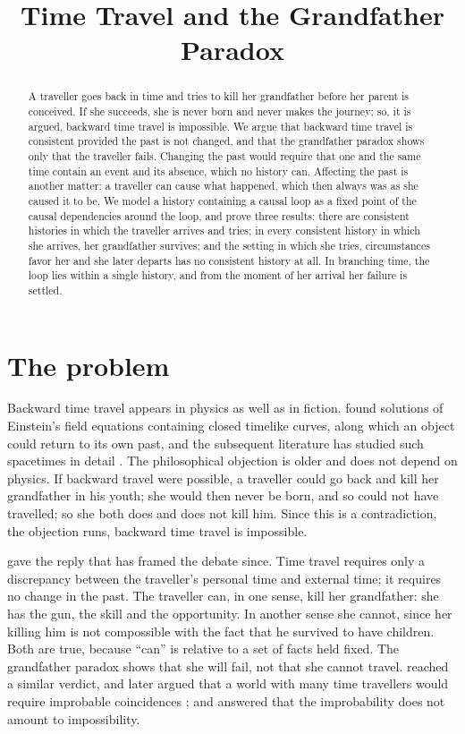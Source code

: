 \documentclass{situationist-preprint}
\title{Time Travel and the Grandfather Paradox}
\begin{document}
\maketitle

\begin{abstract}
A traveller goes back in time and tries to kill her grandfather before her parent is conceived. If she succeeds, she is never born and never makes the journey; so, it is argued, backward time travel is impossible. We argue that backward time travel is consistent provided the past is not changed, and that the grandfather paradox shows only that the traveller fails. Changing the past would require that one and the same time contain an event and its absence, which no history can. Affecting the past is another matter: a traveller can cause what happened, which then always was as she caused it to be. We model a history containing a causal loop as a fixed point of the causal dependencies around the loop, and prove three results: there are consistent histories in which the traveller arrives and tries; in every consistent history in which she arrives, her grandfather survives; and the setting in which she tries, circumstances favor her and she later departs has no consistent history at all. In branching time, the loop lies within a single history, and from the moment of her arrival her failure is settled.
\end{abstract}

\section{The problem}

Backward time travel appears in physics as well as in fiction. \citet{Godel1949} found solutions of Einstein's field equations containing closed timelike curves, along which an object could return to its own past, and the subsequent literature has studied such spacetimes in detail \citep{Earman1995}. The philosophical objection is older and does not depend on physics. If backward travel were possible, a traveller could go back and kill her grandfather in his youth; she would then never be born, and so could not have travelled; so she both does and does not kill him. Since this is a contradiction, the objection runs, backward time travel is impossible.

\citet{Lewis1976} gave the reply that has framed the debate since. Time travel requires only a discrepancy between the traveller's personal time and external time; it requires no change in the past. The traveller can, in one sense, kill her grandfather: she has the gun, the skill and the opportunity. In another sense she cannot, since her killing him is not compossible with the fact that he survived to have children. Both are true, because \enquote{can} is relative to a set of facts held fixed. The grandfather paradox shows that she will fail, not that she cannot travel. \citet{Horwich1975} reached a similar verdict, and later argued that a world with many time travellers would require improbable coincidences \citep{Horwich1987}; \citet{Smith1997} and \citet{Sider2002} answered that the improbability does not amount to impossibility.
\end{document}
